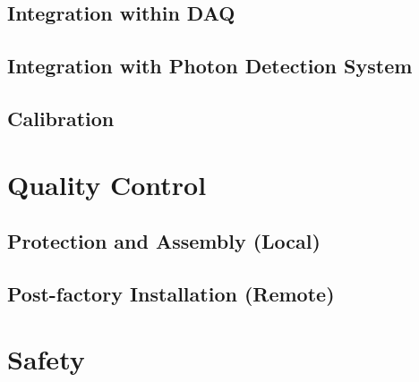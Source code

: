 
\subsection{Integration within DAQ}
\label{sec:fddp-tpc-elec-install-daq}

\subsection{Integration with Photon Detection System}
\label{sec:fddp-tpc-elec-install-pmt}

\subsection{Calibration}
\label{sec:fddp-tpc-elec-install-calib}

\section{Quality Control}
\label{sec:fddp-tpc-elec-qc}

\subsection{Protection and Assembly (Local)}
\label{sec:fddp-tpc-elec-qc-local}


\subsection{Post-factory Installation (Remote)}
\label{sec:fddp-tpc-elec-qc-remote}


\section{Safety}
\label{sec:fddp-tpc-elec-safety}



